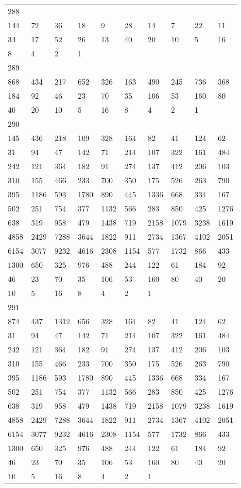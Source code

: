 \begin{longtable}{*{10}{l}}
288&&&&&&&&&\\
144& 72& 36& 18& 9& 28& 14& 7& 22& 11\\
34& 17& 52& 26& 13& 40& 20& 10& 5& 16\\
8& 4& 2& 1& \\

289&&&&&&&&&\\
868& 434& 217& 652& 326& 163& 490& 245& 736& 368\\
184& 92& 46& 23& 70& 35& 106& 53& 160& 80\\
40& 20& 10& 5& 16& 8& 4& 2& 1& \\

290&&&&&&&&&\\
145& 436& 218& 109& 328& 164& 82& 41& 124& 62\\
31& 94& 47& 142& 71& 214& 107& 322& 161& 484\\
242& 121& 364& 182& 91& 274& 137& 412& 206& 103\\
310& 155& 466& 233& 700& 350& 175& 526& 263& 790\\
395& 1186& 593& 1780& 890& 445& 1336& 668& 334& 167\\
502& 251& 754& 377& 1132& 566& 283& 850& 425& 1276\\
638& 319& 958& 479& 1438& 719& 2158& 1079& 3238& 1619\\
4858& 2429& 7288& 3644& 1822& 911& 2734& 1367& 4102& 2051\\
6154& 3077& 9232& 4616& 2308& 1154& 577& 1732& 866& 433\\
1300& 650& 325& 976& 488& 244& 122& 61& 184& 92\\
46& 23& 70& 35& 106& 53& 160& 80& 40& 20\\
10& 5& 16& 8& 4& 2& 1& \\

291&&&&&&&&&\\
874& 437& 1312& 656& 328& 164& 82& 41& 124& 62\\
31& 94& 47& 142& 71& 214& 107& 322& 161& 484\\
242& 121& 364& 182& 91& 274& 137& 412& 206& 103\\
310& 155& 466& 233& 700& 350& 175& 526& 263& 790\\
395& 1186& 593& 1780& 890& 445& 1336& 668& 334& 167\\
502& 251& 754& 377& 1132& 566& 283& 850& 425& 1276\\
638& 319& 958& 479& 1438& 719& 2158& 1079& 3238& 1619\\
4858& 2429& 7288& 3644& 1822& 911& 2734& 1367& 4102& 2051\\
6154& 3077& 9232& 4616& 2308& 1154& 577& 1732& 866& 433\\
1300& 650& 325& 976& 488& 244& 122& 61& 184& 92\\
46& 23& 70& 35& 106& 53& 160& 80& 40& 20\\
10& 5& 16& 8& 4& 2& 1& \\


\end{longtable}
